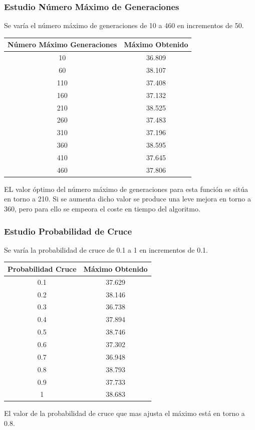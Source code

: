 \documentclass[12pt]{article}
\begin{document}
\subsubsection*{Estudio Número Máximo de Generaciones}
	Se varía el número máximo de generaciones de 10 a 460 en incrementos de 50.
\begin{table}[H]
\begin{center}
\begin{tabular}{|cc|} \hline
Número Máximo Generaciones & Máximo Obtenido \\  \hline
10  & 36.809 \\ 
60  & 38.107 \\ 
110 & 37.408 \\
160 & 37.132 \\
210 & 38.525 \\
260 & 37.483 \\
310 & 37.196 \\
360 & 38.595 \\ 
410 & 37.645 \\
460 & 37.806 \\  \hline
\end{tabular}
\end{center}
\end{table}
	EL valor óptimo del número máximo de generaciones para esta función se sitúa en torno a 210. Si se aumenta dicho valor se produce una leve mejora en torno a 360, pero para ello se empeora el coste en tiempo del algoritmo.

\subsubsection*{Estudio Probabilidad de Cruce}
	Se varía la probabilidad de cruce de 0.1 a 1 en incrementos de 0.1.
\begin{table}[H]
\begin{center}
\begin{tabular}{|cc|} \hline
Probabilidad Cruce & Máximo Obtenido \\  \hline
0.1 & 37.629 \\ 
0.2 & 38.146 \\ 
0.3 & 36.738 \\
0.4 & 37.894 \\
0.5 & 38.746 \\
0.6 & 37.302 \\
0.7 & 36.948 \\
0.8 & 38.793 \\ 
0.9 & 37.733 \\
1   & 38.683 \\  \hline
\end{tabular}
\end{center}
\end{table}
	El valor de la probabilidad de cruce que mas ajusta el máximo está en torno a 0.8.
\end{document}
